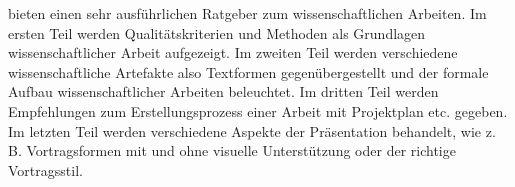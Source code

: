 \cite{balzert2011wissenschaftliches} bieten einen sehr ausführlichen Ratgeber zum wissenschaftlichen Arbeiten. Im ersten Teil werden Qualitätskriterien und Methoden als Grundlagen wissenschaftlicher Arbeit aufgezeigt. Im zweiten Teil werden verschiedene wissenschaftliche Artefakte also Textformen gegenübergestellt und der formale Aufbau wissenschaftlicher Arbeiten beleuchtet. Im dritten Teil werden Empfehlungen zum Erstellungsprozess einer Arbeit mit Projektplan etc. gegeben. Im letzten Teil werden verschiedene Aspekte der Präsentation behandelt, wie z. B. Vortragsformen mit und ohne visuelle Unterstützung oder der richtige Vortragsstil.
